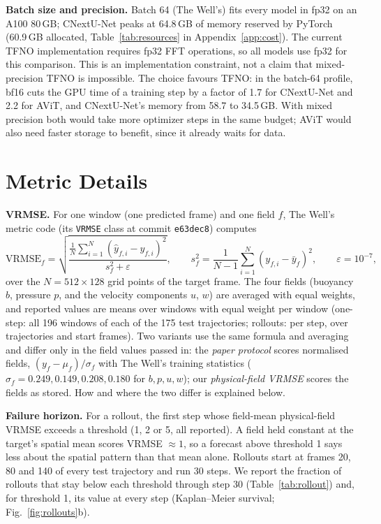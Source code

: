 \documentclass[11pt]{article}
\begin{document}
\textbf{Batch size and precision.} Batch 64 (The Well's) fits every model in fp32 on an A100 80\,GB; CNextU-Net
peaks at 64.8\,GB of memory reserved by PyTorch (60.9\,GB allocated, Table~\ref{tab:resources} in Appendix~\ref{app:cost}). The current TFNO
implementation requires fp32 FFT operations, so all models use fp32 for this comparison. This is an
implementation constraint, not a claim that mixed-precision TFNO is impossible. The choice favours TFNO: in the
batch-64 profile, bf16 cuts the GPU time of a training step by a factor of 1.7 for CNextU-Net and 2.2 for AViT,
and CNextU-Net's memory from 58.7 to 34.5\,GB. With mixed precision both would take more optimizer steps in the
same budget; AViT would also need faster storage to benefit, since it already waits for data.

\FloatBarrier
\section{Metric Details}
\label{app:metrics}

\textbf{VRMSE.} For one window (one predicted frame) and one field $f$, The Well's metric code (its
\texttt{VRMSE} class at commit \texttt{e63dec8}) computes
\[
\mathrm{VRMSE}_f=\sqrt{\frac{\frac{1}{N}\sum_{i=1}^{N}(\hat y_{f,i}-y_{f,i})^2}{s_f^2+\varepsilon}},
\qquad s_f^2=\frac{1}{N-1}\sum_{i=1}^{N}(y_{f,i}-\bar y_f)^2,\qquad \varepsilon=10^{-7},
\]
over the $N=512\times128$ grid points of the target frame. The four fields (buoyancy $b$, pressure $p$, and the
velocity components $u$, $w$) are averaged with equal weights, and reported values are means over windows with
equal weight per window (one-step: all 196 windows of each of the 175 test trajectories; rollouts: per step, over
trajectories and start frames). Two variants use the same formula and averaging and differ only in the field
values passed in: the \emph{paper protocol} scores normalised fields, $(y_f-\mu_f)/\sigma_f$ with The Well's
training statistics ($\sigma_f = 0.249, 0.149, 0.208, 0.180$ for $b, p, u, w$); our \emph{physical-field VRMSE}
scores the fields as stored. How and where the two differ is explained below.

\textbf{Failure horizon.} For a rollout, the first step whose field-mean physical-field VRMSE exceeds a threshold
(1, 2 or 5, all reported). A field held constant at the target's spatial mean scores VRMSE $\approx 1$, so a
forecast above threshold 1 says less about the spatial pattern than that mean alone. Rollouts start at frames 20,
80 and 140 of every test trajectory and run 30 steps. We
report the fraction of rollouts that stay below each threshold through step 30 (Table~\ref{tab:rollout}) and,
for threshold 1, its value at every step (Kaplan--Meier survival; Fig.~\ref{fig:rollouts}b).
\end{document}
